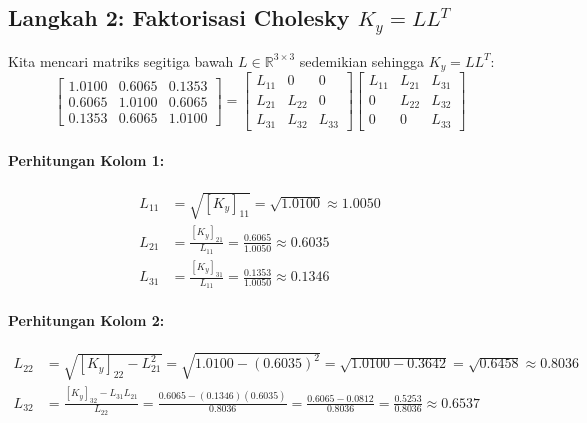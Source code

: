 \documentclass[11pt,a4paper]{article}
\def\mathbf#1{#1}%
\begin{document}
\subsection{Langkah 2: Faktorisasi Cholesky \texorpdfstring{$K_y = L L^T$}{Ky = L L\textasciicircum T}}
Kita mencari matriks segitiga bawah $L \in \mathbb{R}^{3 \times 3}$ sedemikian sehingga $K_y = L L^T$:
\begin{equation}
\begin{bmatrix}
1.0100 & 0.6065 & 0.1353 \\
0.6065 & 1.0100 & 0.6065 \\
0.1353 & 0.6065 & 1.0100
\end{bmatrix}
=
\begin{bmatrix}
L_{11} & 0 & 0 \\
L_{21} & L_{22} & 0 \\
L_{31} & L_{32} & L_{33}
\end{bmatrix}
\begin{bmatrix}
L_{11} & L_{21} & L_{31} \\
0 & L_{22} & L_{32} \\
0 & 0 & L_{33}
\end{bmatrix}
\end{equation}

\paragraph{Perhitungan Kolom 1:}
\begin{align*}
L_{11} &= \sqrt{[K_y]_{11}} = \sqrt{1.0100} \approx \mathbf{1.0050} \\
L_{21} &= \frac{[K_y]_{21}}{L_{11}} = \frac{0.6065}{1.0050} \approx \mathbf{0.6035} \\
L_{31} &= \frac{[K_y]_{31}}{L_{11}} = \frac{0.1353}{1.0050} \approx \mathbf{0.1346}
\end{align*}

\paragraph{Perhitungan Kolom 2:}
\begin{align*}
L_{22} &= \sqrt{[K_y]_{22} - L_{21}^2} = \sqrt{1.0100 - (0.6035)^2} = \sqrt{1.0100 - 0.3642} = \sqrt{0.6458} \approx \mathbf{0.8036} \\
L_{32} &= \frac{[K_y]_{32} - L_{31} L_{21}}{L_{22}} = \frac{0.6065 - (0.1346)(0.6035)}{0.8036} = \frac{0.6065 - 0.0812}{0.8036} = \frac{0.5253}{0.8036} \approx \mathbf{0.6537}
\end{align*}
\end{document}
